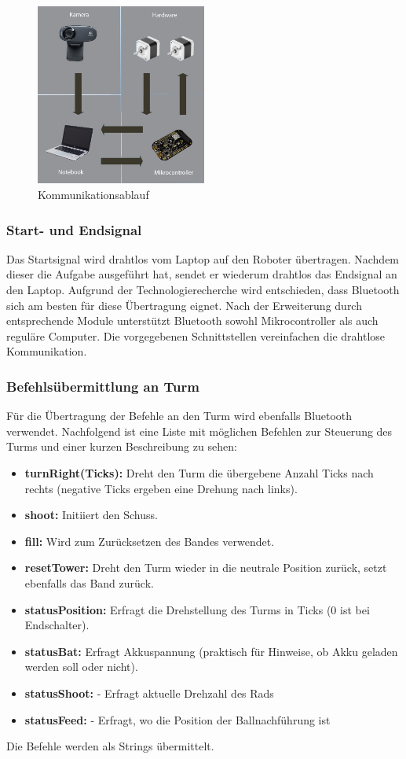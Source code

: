 \begin{figure}[h!]          
	\centering             
	\includegraphics[width=0.5\textwidth]{fig/kommunikationsablauf.jpg}    
	\caption{Kommunikationsablauf}
	
	\label{fig:Kommunikationsablauf}
\end{figure}
\noindent
\subsubsection{Start- und Endsignal}
Das Startsignal wird drahtlos vom Laptop auf den Roboter übertragen. Nachdem 
dieser die Aufgabe ausgeführt hat, sendet er wiederum drahtlos das Endsignal 
an den Laptop. Aufgrund der Technologierecherche wird entschieden, dass 
Bluetooth sich am besten für diese Übertragung eignet. Nach der Erweiterung 
durch entsprechende Module unterstützt Bluetooth sowohl Mikrocontroller als 
auch reguläre Computer. Die vorgegebenen Schnittstellen vereinfachen die 
drahtlose Kommunikation.
\subsubsection{Befehlsübermittlung an Turm}
Für die Übertragung der Befehle an den Turm wird ebenfalls Bluetooth verwendet. Nachfolgend ist eine Liste mit möglichen Befehlen zur Steuerung des Turms und einer kurzen Beschreibung zu sehen:
\begin{itemize}
		\item \textbf{turnRight(Ticks):} Dreht den Turm die übergebene Anzahl Ticks nach rechts (negative Ticks ergeben eine Drehung nach links).
		\item \textbf{shoot:} Initiiert den Schuss.
		\item \textbf{fill:} Wird zum Zurücksetzen des Bandes verwendet.
		\item \textbf{resetTower:} Dreht den Turm wieder in die neutrale Position zurück, setzt ebenfalls das Band zurück.
		\item \textbf{statusPosition:} Erfragt die Drehstellung des Turms in Ticks (0 ist bei Endschalter).
		\item \textbf{statusBat:} Erfragt Akkuspannung (praktisch für Hinweise, ob Akku geladen werden soll oder nicht).
		\item \textbf{statusShoot:} - Erfragt aktuelle Drehzahl des Rads
		\item \textbf{statusFeed:} - Erfragt, wo die Position der Ballnachführung ist
	\end{itemize}
Die Befehle werden als Strings übermittelt.
